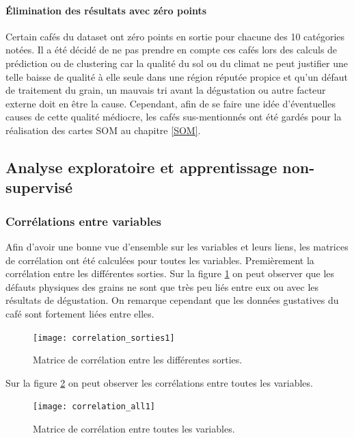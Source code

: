 \paragraph{Élimination des résultats avec zéro points} Certain cafés du dataset ont zéro points en sortie pour chacune des 10 catégories notées. Il a été décidé de ne pas prendre en compte ces cafés lors des calculs de prédiction ou de clustering car la qualité du sol ou du climat ne peut justifier une telle baisse de qualité à elle seule dans une région réputée propice et qu'un défaut de traitement du grain, un mauvais tri avant la dégustation ou autre facteur externe doit en être la cause. Cependant, afin de se faire une idée d'éventuelles causes de cette qualité médiocre, les cafés sus-mentionnés ont été gardés pour la réalisation des cartes SOM au chapitre \ref{SOM}. 





\subsection{Analyse exploratoire et apprentissage non-supervisé}

\subsubsection{Corrélations entre variables}

Afin d'avoir une bonne vue d'ensemble sur les variables et leurs liens, les matrices de corrélation ont été calculées pour toutes les variables. Premièrement la corrélation entre les différentes sorties. Sur la figure \ref{correlation_sorties1} on peut observer que les défauts physiques des grains ne sont que très peu liés entre eux ou avec les résultats de dégustation. On remarque cependant que les données gustatives du café sont fortement liées entre elles. 

\begin{figure}[H]
	\texttt{[image: correlation\_sorties1]}
	\caption{\label{correlation_sorties1} Matrice de corrélation entre les différentes sorties.}
\end{figure}


\noindent Sur la figure \ref{correlation_all1} on peut observer les corrélations entre toutes les variables. 


\begin{figure}[H]
	\texttt{[image: correlation\_all1]}
	\caption{\label{correlation_all1} Matrice de corrélation entre toutes les variables.}
\end{figure}


